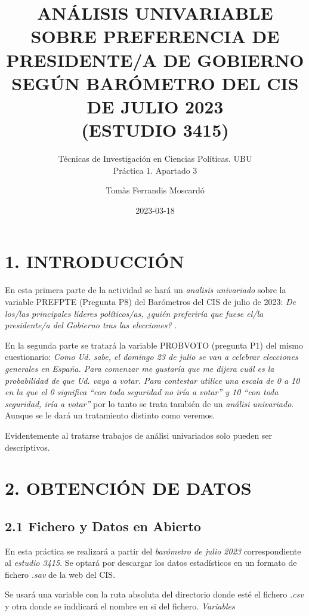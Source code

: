 \documentclass[
]{article}
\title{ANÁLISIS UNIVARIABLE SOBRE PREFERENCIA DE PRESIDENTE/A DE
GOBIERNO SEGÚN BARÓMETRO DEL CIS DE JULIO 2023\\
(ESTUDIO 3415)}
\subtitle{Técnicas de Investigación en Ciencias Políticas. UBU\\
Práctica 1. Apartado 3}
\author{Tomàs Ferrandis Moscardó}
\date{2023-03-18}
\begin{document}
\maketitle

{
\setcounter{tocdepth}{2}
\tableofcontents
}
\newpage

\hypertarget{introducciuxf3n}{%
\section{1. INTRODUCCIÓN}\label{introducciuxf3n}}

En esta primera parte de la actividad se hará un \emph{analisis
univariado} sobre la variable PREFPTE (Pregunta P8) del Barómetros del
CIS de julio de 2023: \emph{De los/las principales líderes políticos/as,
¿quién preferiría que fuese el/la presidente/a del Gobierno tras las
elecciones?} .

En la segunda parte se tratará la variable PROBVOTO (pregunta P1) del
mismo cuestionario: \emph{Como Ud. sabe, el domingo 23 de julio se van a
celebrar elecciones generales en España. Para comenzar me gustaría que
me dijera cuál es la probabilidad de que Ud. vaya a votar. Para
contestar utilice una escala de 0 a 10 en la que el 0 significa ``con
toda seguridad no iría a votar'' y 10 ``con toda seguridad, iría a
votar''} por lo tanto se trata también de un \emph{análisi univariado}.
Aunque se le dará un tratamiento distinto como veremos.

Evidentemente al tratarse trabajos de análisi univariados solo pueden
ser descriptivos.

\hypertarget{obtenciuxf3n-de-datos}{%
\section{2. OBTENCIÓN DE DATOS}\label{obtenciuxf3n-de-datos}}

\hypertarget{fichero-y-datos-en-abierto}{%
\subsection{2.1 Fichero y Datos en
Abierto}\label{fichero-y-datos-en-abierto}}

En esta práctica se realizará a partir del \emph{barómetro de julio
2023} correspondiente al \emph{estudio 3415}. Se optará por descargar
los datos estadísticos en un formato de fichero \emph{.sav} de la web
del CIS.

Se usará una variable con la ruta absoluta del directorio donde esté el
fichero \emph{.csv} y otra donde se inddicará el nombre en si del
fichero. \emph{Variables}
\end{document}
